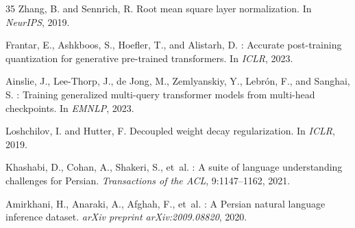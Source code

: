 \documentclass[11pt,a4paper]{article}
\begin{document}
\begin{thebibliography}{35}
Zhang, B. and Sennrich, R.
\newblock Root mean square layer normalization.
\newblock In \emph{NeurIPS}, 2019.

Frantar, E., Ashkboos, S., Hoefler, T., and Alistarh, D.
: Accurate post-training quantization for generative pre-trained transformers.
\newblock In \emph{ICLR}, 2023.

Ainslie, J., Lee-Thorp, J., de Jong, M., Zemlyanskiy, Y., Lebr\'on, F., and Sanghai, S.
: Training generalized multi-query transformer models from multi-head checkpoints.
\newblock In \emph{EMNLP}, 2023.

Loshchilov, I. and Hutter, F.
\newblock Decoupled weight decay regularization.
\newblock In \emph{ICLR}, 2019.

Khashabi, D., Cohan, A., Shakeri, S., et~al.
: A suite of language understanding challenges for {Persian}.
\newblock \emph{Transactions of the ACL}, 9:1147--1162, 2021.

Amirkhani, H., Anaraki, A., Afghah, F., et~al.
: A {Persian} natural language inference dataset.
\newblock \emph{arXiv preprint arXiv:2009.08820}, 2020.

\end{thebibliography}
\end{document}
